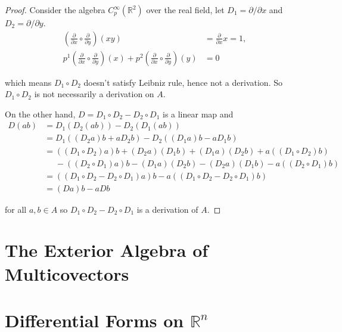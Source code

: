 \begin{proof}
	Consider the algebra \( C^{\infty}_{p}(\mathbb{R}^{2}) \) over the real field, let \( D_{1} = \partial/\partial x \)  and \( D_{2} = \partial/\partial y \).
	\begin{align*}
		\left(\frac{\partial}{\partial x}\circ \frac{\partial}{\partial y}\right)(xy)                                                                                         & = \frac{\partial}{\partial x} x = 1, \\
		p^{1}\left(\frac{\partial}{\partial x}\circ \frac{\partial}{\partial y}\right)(x) + p^{2}\left(\frac{\partial}{\partial x}\circ \frac{\partial}{\partial y}\right)(y) & = 0
	\end{align*}

	which means \( D_{1} \circ D_{2} \) doesn't satisfy Leibniz rule, hence not a derivation. So \( D_{1} \circ D_{2} \) is not necessarily a derivation on \( A \).

	On the other hand, \( D = D_{1}\circ D_{2} - D_{2}\circ D_{1} \) is a linear map and
	\begin{align*}
		D(ab) & = D_{1}(D_{2}(ab)) - D_{2}(D_{1}(ab))                                                               \\
		      & = D_{1}((D_{2}a)b + aD_{2}b) - D_{2}((D_{1}a)b - aD_{1}b)                                           \\
		      & = ((D_{1}\circ D_{2})a)b + (D_{2}a)(D_{1}b) + (D_{1}a)(D_{2}b) + a((D_{1}\circ D_{2})b)             \\
		      & \phantom{=} - ((D_{2}\circ D_{1})a)b - (D_{1}a)(D_{2}b) - (D_{2}a)(D_{1}b) - a((D_{2}\circ D_{1})b) \\
		      & = ((D_{1}\circ D_{2} - D_{2}\circ D_{1})a)b - a((D_{1}\circ D_{2} - D_{2}\circ D_{1})b)             \\
		      & = (Da)b - aDb
	\end{align*}

	for all \( a, b \in A \) so \( D_{1}\circ D_{2} - D_{2}\circ D_{1} \) is a derivation of \( A \).
\end{proof}

\section{The Exterior Algebra of Multicovectors}

\section{Differential Forms on \( \mathbb{R}^{n} \)}
